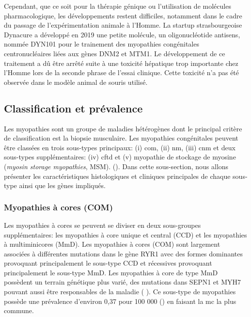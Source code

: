 Cependant, que ce soit pour la thérapie génique ou l'utilisation de molécules pharmacologique, les développements restent difficiles, notamment dans le cadre du passage de l'expérimentation animale à l'Homme. La startup strasbourgeoise Dynacure a développé en 2019 une petite molécule, un oligonucléotide antisens, nommée DYN101 pour le trainement des myopathies congénitales centronucléaires liées aux gènes DNM2 et MTM1. Le développement de ce traitement a dû être arrêté suite à une toxicité hépatique trop importante chez l'Homme lors de la seconde phrase de l'essai clinique. Cette toxicité n'a pas été observée dans le modèle animal de souris utilisé.

\subsection{Classification et prévalence}
Les myopathies sont un groupe de maladies hétérogènes dont le principal critère de classification est la biopsie musculaire. Les myopathies congénitales peuvent être classées en trois sous-types principaux: (i) \gls{com}, (ii) \gls{nm}, (iii) \gls{cnm} et deux sous-types supplémentaires:  (iv) \gls{cftd} et (v) myopathie de stockage de myosine (\textit{myosin storage myopathies}, MSM). (\cite{cassandrini_congenital_2017, claeys_congenital_2020, north_approach_2014}). Dans cette sous-section, nous allons présenter les caractéristiques histologiques et cliniques principales de chaque sous-type ainsi que les gènes impliqués. 

\subsubsection{Myopathies à cores (COM)}
Les myopathies à cores se peuvent se diviser en deux sous-groupes supplémentaires: les myopathies à core unique et central (CCD) et les myopathies à multiminicores (MmD). Les myopathies à cores (COM) sont largement associées à différentes mutations dans le gène RYR1 avec des formes dominantes provoquant principalement le sous-type CCD et récessives provoquant principalement le sous-type MmD. Les myopathies à core de type MmD possèdent un terrain génétique plus varié, des mutations dans SEPN1 et MYH7 pouvant aussi être responsables de la maladie (\cite{cassandrini_congenital_2017} ). Ce sous-type de myopathies possède une prévalence d'environ 0,37 pour 100 000 (\cite{huang_systematic_2021}) en faisant la \gls{mc} la plus commune. 


